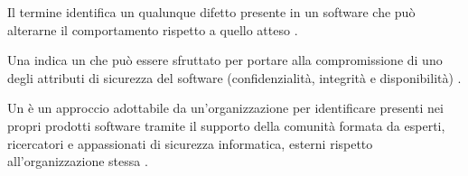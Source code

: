 \begin{definizione}[\Bug]
Il termine \bug identifica un qualunque difetto presente in un software che può alterarne il comportamento rispetto a quello atteso \cite{fryer2017bugbounty, bettini2021tdd15}.
\end{definizione}

\begin{definizione}[\Vulnerability]
Una \vulnerability indica un \bug che può essere sfruttato per portare alla compromissione di uno degli attributi di sicurezza del software (confidenzialità, integrità e disponibilità) \cite{fryer2017bugbounty, mitropoulos2017securing}.
\end{definizione}



\begin{definizione}
Un \CVD è un approccio adottabile da un'organizzazione per identificare \vulnerability presenti nei propri prodotti software tramite il supporto della comunità formata da esperti, ricercatori e appassionati di sicurezza informatica, esterni rispetto all'organizzazione stessa \cite{walshe2023bountythesis2, walshe2022cvdpaper}.
\end{definizione}


